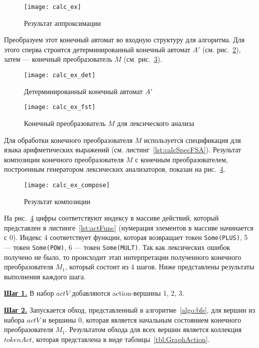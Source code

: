 \documentclass[10pt, conference, compsocconf]{IEEEtran}
\begin{document}
\begin{figure}[h]
\centering
\texttt{[image: calc\_ex]}
\caption{Результат аппроксимации}
\label{fig:calc_ex}
\end{figure}

Преобразуем этот конечный автомат во входную структуру для алгоритма. Для этого сперва строится детерминированный конечный автомат $A'$ (см. рис.~\ref{fig:calc_ex_det}), затем --- конечный преобразователь $M$ (см. рис.~\ref{fig:calc_ex_fst}). 

\begin{figure}[h]
\centering
\texttt{[image: calc\_ex\_det]}
\caption{Детерминированный конечный автомат $A'$}
\label{fig:calc_ex_det}
\end{figure}

\begin{figure}[h]
\centering
\texttt{[image: calc\_ex\_fst]}
\caption{Конечный преобразователь $M$ для лексического анализа }
\label{fig:calc_ex_fst}
\end{figure}

Для обработки конечного преобразователя $M$ используется спецификация для языка арифметических выражений (см. листинг~\ref{lst:calcSpecFSA}). Результат композиции конечного преобразователя $M$ с конечным преобразователем, построенным генератором лексических анализаторов, показан на рис.~\ref{fig:calc_ex_compose}. 

\begin{figure}[h]
\centering
\texttt{[image: calc\_ex\_compose]}
\caption{Результат композиции }
\label{fig:calc_ex_compose}
\end{figure}

На рис.~\ref{fig:calc_ex_compose} цифры соответствуют индексу в массиве действий, который представлен в листинге~\ref{lst:actFunc} (нумерация элементов в массиве начинается с 0). Индекс 4 соответствует функции, которая возвращает токен \verb|Some(PLUS)|, 5 --- токен \verb|Some(POW)|, 6 --- токен \verb|Some(MULT)|. Так как лексических ошибок получено не было, то происходит этап интерпретации полученного конечного преобразователя $M_1$, который состоит из 4 шагов. Ниже представлены результаты выполнения каждого шага.

\textbf{\underline{Шаг 1.}} В набор $actV$ добавляются action-вершины  1, 2, 3.

\textbf{\underline{Шаг 2.}} Запускается обход, представленный в алгоритме~\ref{algo:bfs}, для вершин из набора  $actV$ и вершины 0, которая является начальным состоянием конечного преобразователя $M_1$. Результатом обхода для всех вершин является коллекция $tokenAct$, которая представлена в виде таблицы~\ref{tbl:GraphAction}. 
\end{document}
